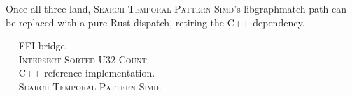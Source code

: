 Once all three land, \textsc{Search-Temporal-Pattern-Simd}'s
libgraphmatch path can be replaced with a pure-Rust dispatch,
retiring the C++ dependency.

\begin{inthecode}
 --- FFI
bridge.\\
 ---
\textsc{Intersect-Sorted-U32-Count}.\\
 --- C++ reference
implementation.\\
 ---
\textsc{Search-Temporal-Pattern-Simd}.
\end{inthecode}
